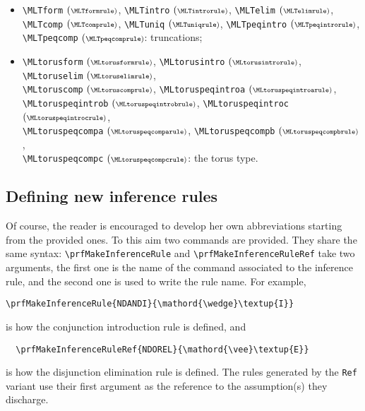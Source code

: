 \documentclass{amsart}
\begin{document}
\begin{itemize}
  \verb|\MLPOintrob| $(\scriptstyle\MLPOintrobrule)$, \\
  \verb|\MLPOelim| $(\scriptstyle\MLPOelimrule)$,
  \verb|\MLPOcompa| $(\scriptstyle\MLPOcomparule)$,
  \verb|\MLPOcompb| $(\scriptstyle\MLPOcompbrule)$, \\
  \verb|\MLPOuniq| $(\scriptstyle\MLPOuniqrule)$,
  \verb|\MLPOpeqintro| $(\scriptstyle\MLPOpeqintrorule)$,
  \verb|\MLPOpeqcomp| $(\scriptstyle\MLPOpeqcomprule)$: pushouts;
\item \verb|\MLTform| $(\scriptstyle\MLTformrule)$,
  \verb|\MLTintro| $(\scriptstyle\MLTintrorule)$,
  \verb|\MLTelim| $(\scriptstyle\MLTelimrule)$, \\
  \verb|\MLTcomp| $(\scriptstyle\MLTcomprule)$,
  \verb|\MLTuniq| $(\scriptstyle\MLTuniqrule)$,
  \verb|\MLTpeqintro| $(\scriptstyle\MLTpeqintrorule)$, \\
  \verb|\MLTpeqcomp| $(\scriptstyle\MLTpeqcomprule)$: truncations;
\item \verb|\MLtorusform| $(\scriptstyle\MLtorusformrule)$,
  \verb|\MLtorusintro| $(\scriptstyle\MLtorusintrorule)$,
  \verb|\MLtoruselim| $(\scriptstyle\MLtoruselimrule)$,\\
  \verb|\MLtoruscomp| $(\scriptstyle\MLtoruscomprule)$,
  \verb|\MLtoruspeqintroa| $(\scriptstyle\MLtoruspeqintroarule)$, \\
  \verb|\MLtoruspeqintrob| $(\scriptstyle\MLtoruspeqintrobrule)$,
  \verb|\MLtoruspeqintroc| $(\scriptstyle\MLtoruspeqintrocrule)$, \\
  \verb|\MLtoruspeqcompa| $(\scriptstyle\MLtoruspeqcomparule)$,
  \verb|\MLtoruspeqcompb| $(\scriptstyle\MLtoruspeqcompbrule)$, \\
  \verb|\MLtoruspeqcompc| $(\scriptstyle\MLtoruspeqcompcrule)$:
  the torus type.
\end{itemize}

\subsection{Defining new inference rules}
Of course, the reader is encouraged to develop her own abbreviations
starting from the provided ones. To this aim two commands are
provided. They share the same syntax: \verb|\prfMakeInferenceRule| and
\verb|\prfMakeInferenceRuleRef| take two arguments, the first one is
the name of the command associated to the inference rule, and the
second one is used to write the rule name. For example,
\begin{center}
  \verb|\prfMakeInferenceRule{NDANDI}{\mathord{\wedge}\textup{I}}| 
\end{center}
is how the conjunction introduction rule is defined, and
\begin{center}
  \verb|  \prfMakeInferenceRuleRef{NDOREL}{\mathord{\vee}\textup{E}}|
\end{center}
is how the disjunction elimination rule is defined. The rules
generated by the \verb|Ref| variant use their first argument as the
reference to the assumption(s) they discharge.
\end{document}
